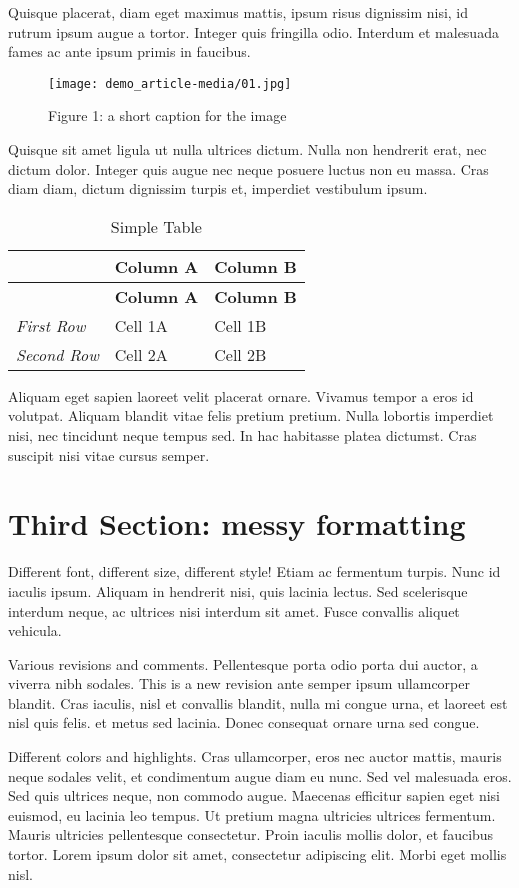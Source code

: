 \documentclass[american,a4paper,]{article}
\begin{document}
Quisque placerat, diam eget maximus mattis, ipsum risus dignissim nisi,
id rutrum ipsum augue a tortor. Integer quis fringilla odio. Interdum et
malesuada fames ac ante ipsum primis in faucibus.

\begin{figure}
\centering
\texttt{[image: demo\_article-media/01.jpg]}
\caption{Figure 1: a short caption for the image}
\end{figure}

Quisque sit amet ligula ut nulla ultrices dictum. Nulla non hendrerit
erat, nec dictum dolor. Integer quis augue nec neque posuere luctus non
eu massa. Cras diam diam, dictum dignissim turpis et, imperdiet
vestibulum ipsum.

\begin{longtable}[]{@{}lll@{}}
\caption{Simple Table}\tabularnewline
\toprule
& \textbf{Column A} & \textbf{Column B}\tabularnewline
\midrule
\endfirsthead
\toprule
& \textbf{Column A} & \textbf{Column B}\tabularnewline
\midrule
\endhead
\emph{First Row} & Cell 1A & Cell 1B\tabularnewline
\emph{Second Row} & Cell 2A & Cell 2B\tabularnewline
\bottomrule
\end{longtable}

Aliquam eget sapien laoreet velit placerat ornare. Vivamus tempor a eros
id volutpat. Aliquam blandit vitae felis pretium pretium. Nulla lobortis
imperdiet nisi, nec tincidunt neque tempus sed. In hac habitasse platea
dictumst. Cras suscipit nisi vitae cursus semper.

\hypertarget{third-section-messy-formatting}{%
\section{Third Section: messy
formatting}\label{third-section-messy-formatting}}

Different font, different size, different style! Etiam ac fermentum
turpis. Nunc id iaculis ipsum. Aliquam in hendrerit nisi, quis lacinia
lectus. Sed scelerisque interdum neque, ac ultrices nisi interdum sit
amet. Fusce convallis aliquet vehicula.

Various revisions and comments. Pellentesque porta odio porta dui
auctor, a viverra nibh sodales. This is a new revision ante semper ipsum
ullamcorper blandit. Cras iaculis, nisl et convallis blandit, nulla mi
congue urna, et laoreet est nisl quis felis. et metus sed lacinia. Donec
consequat ornare urna sed congue.

Different colors and highlights. Cras ullamcorper, eros nec auctor
mattis, mauris neque sodales velit, et condimentum augue diam eu nunc.
Sed vel malesuada eros. Sed quis ultrices neque, non commodo augue.
Maecenas efficitur sapien eget nisi euismod, eu lacinia leo tempus. Ut
pretium magna ultricies ultrices fermentum. Mauris ultricies
pellentesque consectetur. Proin iaculis mollis dolor, et faucibus
tortor. Lorem ipsum dolor sit amet, consectetur adipiscing elit. Morbi
eget mollis nisl.
\end{document}
